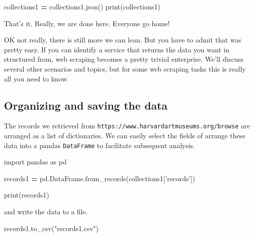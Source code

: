 \documentclass[]{book}
\newenvironment{Shaded}{\begin{snugshade}}{\end{snugshade}}
\newcommand{\StringTok}[1]{\textcolor[rgb]{0.31,0.60,0.02}{#1}}
\newcommand{\ImportTok}[1]{#1}
\newcommand{\OperatorTok}[1]{\textcolor[rgb]{0.81,0.36,0.00}{\textbf{#1}}}
\newcommand{\BuiltInTok}[1]{#1}
\newcommand{\NormalTok}[1]{#1}
\begin{document}
\begin{Shaded}
\begin{Highlighting}[]
\NormalTok{collections1 }\OperatorTok{=}\NormalTok{ collections1.json()}
\BuiltInTok{print}\NormalTok{(collections1)}
\end{Highlighting}
\end{Shaded}

That's it. Really, we are done here. Everyone go home!

OK not really, there is still more we can lean. But you have to admit
that was pretty easy. If you can identify a service that returns the
data you want in structured from, web scraping becomes a pretty trivial
enterprise. We'll discuss several other scenarios and topics, but for
some web scraping tasks this is really all you need to know.

\subsection{Organizing and saving the
data}\label{organizing-and-saving-the-data}

The records we retrieved from
\texttt{https://www.harvardartmuseums.org/browse} are arranged as a list
of dictionaries. We can easily select the fields of arrange these data
into a pandas \texttt{DataFrame} to facilitate subsequent analysis.

\begin{Shaded}
\begin{Highlighting}[]
\ImportTok{import}\NormalTok{ pandas }\ImportTok{as}\NormalTok{ pd}
\end{Highlighting}
\end{Shaded}

\begin{Shaded}
\begin{Highlighting}[]
\NormalTok{records1 }\OperatorTok{=}\NormalTok{ pd.DataFrame.from_records(collections1[}\StringTok{'records'}\NormalTok{])}
\end{Highlighting}
\end{Shaded}

\begin{Shaded}
\begin{Highlighting}[]
\BuiltInTok{print}\NormalTok{(records1)}
\end{Highlighting}
\end{Shaded}

and write the data to a file.

\begin{Shaded}
\begin{Highlighting}[]
\NormalTok{records1.to_csv(}\StringTok{"records1.csv"}\NormalTok{)}
\end{Highlighting}
\end{Shaded}
\end{document}
